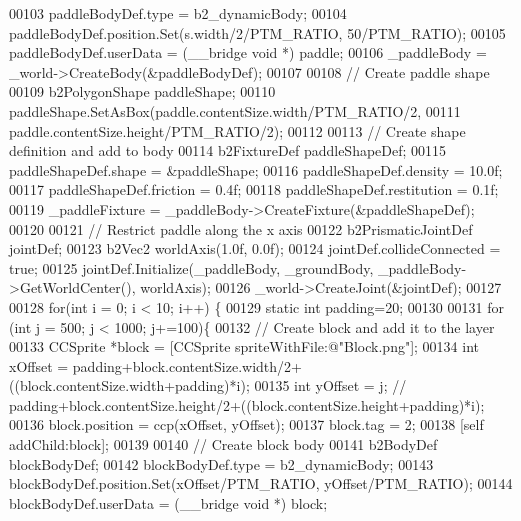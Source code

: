 \begin{DoxyCode}
00103         paddleBodyDef.type = b2\_dynamicBody;
00104         paddleBodyDef.position.Set(s.width/2/PTM\_RATIO, 50/PTM\_RATIO);
00105         paddleBodyDef.userData =  (\_\_bridge \textcolor{keywordtype}{void} *) paddle;
00106         \_paddleBody = \_world->CreateBody(&paddleBodyDef);
00107 
00108         \textcolor{comment}{// Create paddle shape}
00109         b2PolygonShape paddleShape;
00110         paddleShape.SetAsBox(paddle.contentSize.width/PTM\_RATIO/2, 
00111                              paddle.contentSize.height/PTM\_RATIO/2);
00112 
00113         \textcolor{comment}{// Create shape definition and add to body}
00114         b2FixtureDef paddleShapeDef;
00115         paddleShapeDef.shape = &paddleShape;
00116         paddleShapeDef.density = 10.0f;
00117         paddleShapeDef.friction = 0.4f;
00118         paddleShapeDef.restitution = 0.1f;
00119         \_paddleFixture = \_paddleBody->CreateFixture(&paddleShapeDef);
00120         
00121         \textcolor{comment}{// Restrict paddle along the x axis}
00122         b2PrismaticJointDef jointDef;
00123         b2Vec2 worldAxis(1.0f, 0.0f);
00124         jointDef.collideConnected = \textcolor{keyword}{true};
00125         jointDef.Initialize(\_paddleBody, \_groundBody, \_paddleBody->GetWorldCenter(), worldAxis);
00126         \_world->CreateJoint(&jointDef);
00127         
00128         \textcolor{keywordflow}{for}(\textcolor{keywordtype}{int} i = 0; i < 10; i++) \{
00129             \textcolor{keyword}{static} \textcolor{keywordtype}{int} padding=20;
00130             
00131             \textcolor{keywordflow}{for} (\textcolor{keywordtype}{int} j = 500; j < 1000; j+=100)\{
00132                 \textcolor{comment}{// Create block and add it to the layer}
00133                 CCSprite *block = [CCSprite spriteWithFile:@"Block.png"];
00134                 \textcolor{keywordtype}{int} xOffset = padding+block.contentSize.width/2+((block.contentSize.width+padding)*i);
00135                 \textcolor{keywordtype}{int} yOffset = j; \textcolor{comment}{//
      padding+block.contentSize.height/2+((block.contentSize.height+padding)*i);}
00136                 block.position = ccp(xOffset, yOffset);
00137                 block.tag = 2;
00138                 [\textcolor{keyword}{self} addChild:block];
00139                 
00140                 \textcolor{comment}{// Create block body}
00141                 b2BodyDef blockBodyDef;
00142                 blockBodyDef.type = b2\_dynamicBody;
00143                 blockBodyDef.position.Set(xOffset/PTM\_RATIO, yOffset/PTM\_RATIO);
00144                 blockBodyDef.userData =  (\_\_bridge \textcolor{keywordtype}{void} *) block;

\end{DoxyCode}
